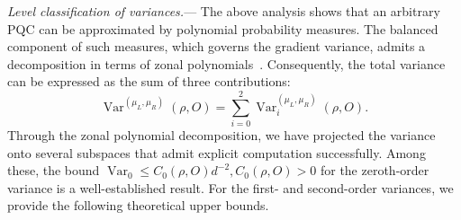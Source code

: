 \documentclass[%
 reprint,
 superscriptaddress,
 amsmath,amssymb,
 aps, prl, twocolumn, showpacs,
]{revtex4-2}
\newcommand*{\dif}{\mathop{}\!\mathrm{d}}
\begin{document}


\emph{Level classification of variances.}--- The above analysis shows that an arbitrary PQC can be approximated by polynomial probability measures. The balanced component of such measures, which governs the gradient variance, admits a decomposition in terms of zonal polynomials~\cite{james1961zonal,james1964distributions,constantine1963some}. Consequently, the total variance can be expressed as the sum of three contributions:
\begin{equation}
    \operatorname{Var}^{(\mu_L, \mu_R)}(\rho, O) = \sum_{i=0}^2 \operatorname{Var}_i^{(\mu_L, \mu_R)}(\rho, O).
    \label{eq:var_decomp}
\end{equation}
Through the zonal polynomial decomposition, we have projected the variance onto several subspaces that admit explicit computation successfully. Among these, the bound $\operatorname{Var}_0 \leq C_0(\rho,O) d^{-2}, C_0(\rho,O)>0$ for the zeroth-order variance is a well-established result. For the first- and second-order variances, we provide the following theoretical upper bounds.
\end{document}
